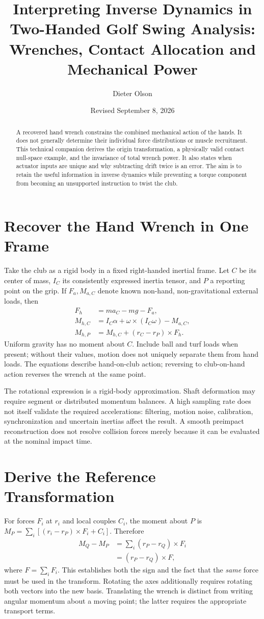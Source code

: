 \documentclass[11pt,a4paper]{article}
\title{Interpreting Inverse Dynamics in Two-Handed Golf Swing Analysis:\\Wrenches, Contact Allocation and Mechanical Power}
\author{Dieter Olson}
\date{Revised September 8, 2026}
\begin{document}
\maketitle
\begin{abstract}
A recovered hand wrench constrains the combined mechanical action of the hands. It does not generally determine their individual force distributions or muscle recruitment. This technical companion derives the origin transformation, a physically valid contact null-space example, and the invariance of total wrench power. It also states when actuator inputs are unique and why subtracting drift twice is an error. The aim is to retain the useful information in inverse dynamics while preventing a torque component from becoming an unsupported instruction to twist the club.
\end{abstract}

\section{Recover the Hand Wrench in One Frame}
Take the club as a rigid body in a fixed right-handed inertial frame. Let $C$ be its center of mass, $I_C$ its consistently expressed inertia tensor, and $P$ a reporting point on the grip. If $F_a,M_{a,C}$ denote known non-hand, non-gravitational external loads, then
\begin{align}
F_h&=ma_C-mg-F_a,\\
M_{h,C}&=I_C\alpha+\omega\times(I_C\omega)-M_{a,C},\\
M_{h,P}&=M_{h,C}+(r_C-r_P)\times F_h.\label{eq:recover}
\end{align}
Uniform gravity has no moment about $C$. Include ball and turf loads when present; without their values, motion does not uniquely separate them from hand loads. The equations describe hand-on-club action; reversing to club-on-hand action reverses the wrench at the same point.

The rotational expression is a rigid-body approximation. Shaft deformation may require segment or distributed momentum balances. A high sampling rate does not itself validate the required accelerations: filtering, motion noise, calibration, synchronization and uncertain inertias affect the result. A smooth preimpact reconstruction does not resolve collision forces merely because it can be evaluated at the nominal impact time.

\section{Derive the Reference Transformation}
For forces $F_i$ at $r_i$ and local couples $C_i$, the moment about $P$ is
$M_P=\sum_i[(r_i-r_P)\times F_i+C_i]$. Therefore
\begin{align}
M_Q-M_P
&=\sum_i(r_P-r_Q)\times F_i\\
&=(r_P-r_Q)\times F,
\end{align}
where $F=\sum_iF_i$. This establishes both the sign and the fact that the \emph{same} force must be used in the transform. Rotating the axes additionally requires rotating both vectors into the new basis. Translating the wrench is distinct from writing angular momentum about a moving point; the latter requires the appropriate transport terms.
\end{document}
